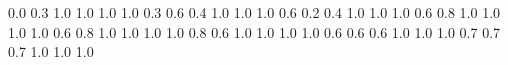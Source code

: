 \documentclass[a4paper,10pt]{report}
\begin{document}
\thispagestyle{empty}
\begin{landscape}
\noindent{}

\newcommand{\ft}{\footnotesize}

\setslotsize{3.5cm}{0.087cm}
\settextframe{0.8mm}
\setbottomstyle{\tiny}
\seteventcornerradius{1pt}



       {0.0} {0.3} {1.0} {1.0} {1.0} {1.0}
   {0.3} {0.6} {0.4} {1.0} {1.0} {1.0}
   {0.6} {0.2} {0.4} {1.0} {1.0} {1.0}
    {0.6} {0.8} {1.0} {1.0} {1.0} {1.0}
      {0.6} {0.8} {1.0} {1.0} {1.0} {1.0}
     {0.8} {0.6} {1.0} {1.0} {1.0} {1.0}
      {0.6} {0.6} {0.6} {1.0} {1.0} {1.0}
     {0.7} {0.7} {0.7} {1.0} {1.0} {1.0}

\begin{timetable}
  
\end{timetable}
\end{landscape}
\end{document}

